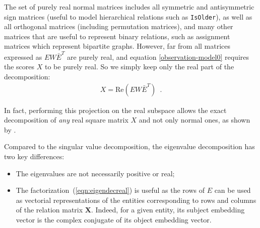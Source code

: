 \documentclass{article}
\newcommand{\transp}{^{T}}
\newcommand{\X}{\bm{X}}
\newcommand{\real}{\mathrm{Re}}
\newcommand{\Relation}{\mathbf{X}}
\newcommand{\Eemb}{E} %
\def\tt{\texttt}
\begin{document}
The set of purely real normal matrices includes all
 symmetric and antisymmetric sign matrices (useful to model hierarchical
relations such as \tt{IsOlder}), as well as 
all orthogonal matrices (including permutation matrices), and many other matrices that are useful to represent binary relations, such as assignment matrices which represent bipartite graphs. However, far from all matrices expressed as $E W \bar{E}^T$ are
purely real, and equation \ref{observation-model0} requires the scores $X$ to be purely real. So we simply keep only the real part of the
decomposition:
\begin{eqnarray}
X = \real(E W \bar{E}^T)\enspace.
\label{eqn:eigendecreal}
\end{eqnarray}

In fact, performing this projection on the real subspace allows the exact
decomposition of \emph{any} real square matrix $X$ and not only normal ones,
as shown by \citet{trouillon_unitdiag2016}.








Compared to the singular value decomposition, the eigenvalue decomposition has two key differences:
\begin{itemize}
    \item The eigenvalues are not necessarily positive or real;
    \item The factorization~(\ref{eqn:eigendecreal}) is useful as the rows of
    $E$ can be used as vectorial representations of the entities corresponding 
    to rows and columns of the relation matrix $\Relation$. Indeed, for a given entity, its subject embedding vector is the complex conjugate of its object embedding vector. 
\end{itemize}
\end{document}
